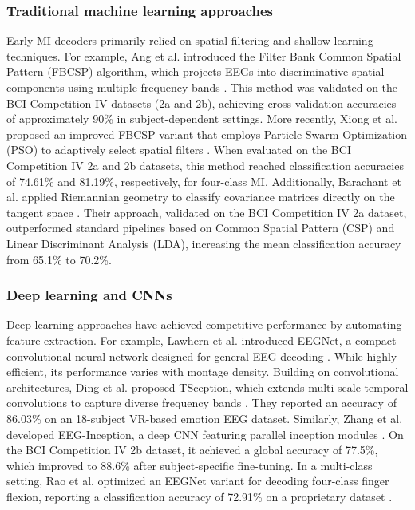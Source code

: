 \documentclass[a4paper,fleqn]{cas-dc}
\begin{document}
\subsubsection{Traditional machine learning approaches}
Early MI decoders primarily relied on spatial filtering and shallow learning techniques. For example, Ang et al. introduced the Filter Bank Common Spatial Pattern (FBCSP) algorithm, which projects EEGs into discriminative spatial components using multiple frequency bands \citep{7ang2008filter}. This method was validated on the BCI Competition IV datasets (2a and 2b), achieving cross-validation accuracies of approximately 90\% in subject-dependent settings. More recently, Xiong et al. proposed an improved FBCSP variant that employs Particle Swarm Optimization (PSO) to adaptively select spatial filters \citep{14xiong2023improved}. When evaluated on the BCI Competition IV 2a and 2b datasets, this method reached classification accuracies of 74.61\% and 81.19\%, respectively, for four-class MI. Additionally, Barachant et al. applied Riemannian geometry to classify covariance matrices directly on the tangent space \citep{8barachant2011multiclass}. Their approach, validated on the BCI Competition IV 2a dataset, outperformed standard pipelines based on Common Spatial Pattern (CSP) and Linear Discriminant Analysis (LDA), increasing the mean classification accuracy from 65.1\% to 70.2\%.

\subsubsection{Deep learning and CNNs}
Deep learning approaches have achieved competitive performance by automating feature extraction. For example, Lawhern et al. introduced EEGNet, a compact convolutional neural network designed for general EEG decoding \citep{9lawhern2018eegnet}. While highly efficient, its performance varies with montage density. Building on convolutional architectures, Ding et al. proposed TSception, which extends multi-scale temporal convolutions to capture diverse frequency bands \citep{10ding2020tsceptiondeeplearningframework}. They reported an accuracy of 86.03\% on an 18-subject VR-based emotion EEG dataset. Similarly, Zhang et al. developed EEG-Inception, a deep CNN featuring parallel inception modules \citep{zhang2021eeg}. On the BCI Competition IV 2b dataset, it achieved a global accuracy of 77.5\%, which improved to 88.6\% after subject-specific fine-tuning. In a multi-class setting, Rao et al. optimized an EEGNet variant for decoding four-class finger flexion, reporting a classification accuracy of 72.91\% on a proprietary dataset \citep{15rao2024optimized}.
\end{document}
